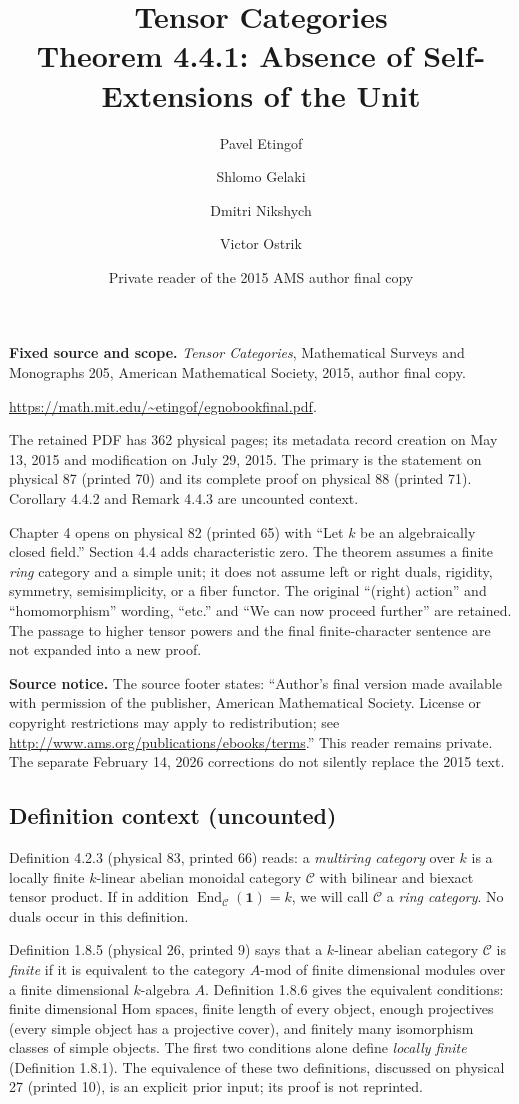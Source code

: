 \documentclass[11pt]{article}
\title{Tensor Categories\\Theorem 4.4.1: Absence of Self-Extensions of the Unit}
\author{Pavel Etingof \and Shlomo Gelaki \and Dmitri Nikshych \and Victor Ostrik}
\date{Private reader of the 2015 AMS author final copy}
\DeclareMathOperator{\End}{End}
\newcommand{\Cat}{\mathcal C}
\newcommand{\unit}{\mathbf 1}
\begin{document}
\maketitle

\noindent\textbf{Fixed source and scope.}
\emph{Tensor Categories}, Mathematical Surveys and Monographs 205,
American Mathematical Society, 2015, author final copy.
\par\noindent\url{https://math.mit.edu/~etingof/egnobookfinal.pdf}.
\par\noindent
The retained PDF has 362 physical pages; its metadata record creation on
May 13, 2015 and modification on July 29, 2015. The primary is the
statement on physical 87 (printed 70) and its complete proof on physical
88 (printed 71). Corollary 4.4.2 and Remark 4.4.3 are uncounted context.

Chapter 4 opens on physical 82 (printed 65) with ``Let $k$ be an
algebraically closed field.'' Section 4.4 adds characteristic zero.
The theorem assumes a finite \emph{ring} category and a simple unit;
it does not assume left or right duals, rigidity, symmetry,
semisimplicity, or a fiber functor. The original ``(right) action'' and
``homomorphism'' wording, ``etc.'' and ``We can now proceed further''
are retained. The passage to higher tensor powers and the final
finite-character sentence are not expanded into a new proof.

\noindent\textbf{Source notice.}
The source footer states: ``Author's final version made available with
permission of the publisher, American Mathematical Society. License or
copyright restrictions may apply to redistribution; see
\url{http://www.ams.org/publications/ebooks/terms}.'' This reader remains
private. The separate February 14, 2026 corrections do not silently
replace the 2015 text.

\subsection*{Definition context (uncounted)}
Definition 4.2.3 (physical 83, printed 66) reads: a \emph{multiring
category} over $k$ is a locally finite $k$-linear abelian monoidal
category $\Cat$ with bilinear and biexact tensor product. If in addition
$\End_{\Cat}(\unit)=k$, we will call $\Cat$ a \emph{ring category}.
No duals occur in this definition.

Definition 1.8.5 (physical 26, printed 9) says that a $k$-linear abelian
category $\Cat$ is \emph{finite} if it is equivalent to the category
$A\text{-mod}$ of finite dimensional modules over a finite dimensional
$k$-algebra $A$. Definition 1.8.6 gives the equivalent conditions:
finite dimensional Hom spaces, finite length of every object, enough
projectives (every simple object has a projective cover), and finitely
many isomorphism classes of simple objects. The first two conditions
alone define \emph{locally finite} (Definition 1.8.1). The equivalence
of these two definitions, discussed on physical 27 (printed 10), is an
explicit prior input; its proof is not reprinted.
\end{document}
